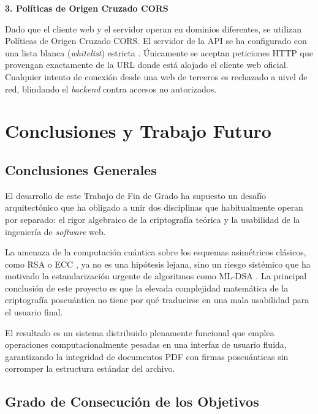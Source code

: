 \documentclass[11pt, a4paper]{report}
\theoremstyle{definition}
\begin{document}
\textbf{3. Políticas de Origen Cruzado CORS}\vspace{0.3cm}

Dado que el cliente web y el servidor operan en dominios diferentes, se utilizan Políticas de Origen Cruzado CORS. El servidor de la API se ha configurado con una lista blanca (\textit{whitelist}) estricta \cite{mdn_cors}. Únicamente se aceptan peticiones HTTP que provengan exactamente de la URL donde está alojado el cliente web oficial. Cualquier intento de conexión desde una web de terceros es rechazado a nivel de red, blindando el \textit{backend} contra accesos no autorizados.


\chapter{Conclusiones y Trabajo Futuro}
\label{ch:conclusiones}

\section{Conclusiones Generales}
\label{sec:conclusiones_generales}

El desarrollo de este Trabajo de Fin de Grado ha supuesto un desafío arquitectónico que ha obligado a unir dos disciplinas que habitualmente operan por separado: el rigor algebraico de la criptografía teórica y la usabilidad de la ingeniería de \textit{software} web. 

La amenaza de la computación cuántica sobre los esquemas asimétricos clásicos, como RSA \cite{rivest1978} o ECC \cite{miller1985}, ya no es una hipótesis lejana, sino un riesgo sistémico que ha motivado la estandarización urgente de algoritmos como ML-DSA \cite{nist_fips204}. La principal conclusión de este proyecto es que la elevada complejidad matemática de la criptografía poscuántica no tiene por qué traducirse en una mala usabilidad para el usuario final.

El resultado es un sistema distribuido plenamente funcional que emplea operaciones computacionalmente pesadas en una interfaz de usuario fluida, garantizando la integridad de documentos PDF con firmas poscuánticas sin corromper la estructura estándar del archivo.

\section{Grado de Consecución de los Objetivos}
\label{sec:grado_consecucion}
\end{document}
